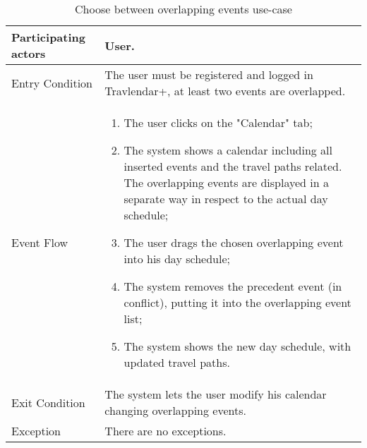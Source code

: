 \begin{table}[H]
	\begin{center}
		\begin{tabular}{ | p{} | p{} | }
		\hline
		Participating actors & User.\\
		\hline
		Entry Condition & The user must be registered and logged in Travlendar+, at least two events are overlapped.\\
		\hline
		Event Flow & 
			\begin{enumerate}
				\item The user clicks on the "Calendar" tab;
				\item The system shows a calendar including all inserted events and the travel paths related. The overlapping events are displayed in a separate way in respect to the actual day schedule;
				\item The user drags the chosen overlapping event into his day schedule;
				\item The system removes the precedent event (in conflict), putting it into the overlapping event list;
				\item The system shows the new day schedule, with updated travel paths.
			\end{enumerate} \\
		\hline
		Exit Condition & The system lets the user modify his calendar changing overlapping events. \\
		\hline
		Exception & There are no exceptions.\\ 
		\hline
		\end{tabular}
	\end{center}
	\caption{Choose between overlapping events use-case}
\end{table}
